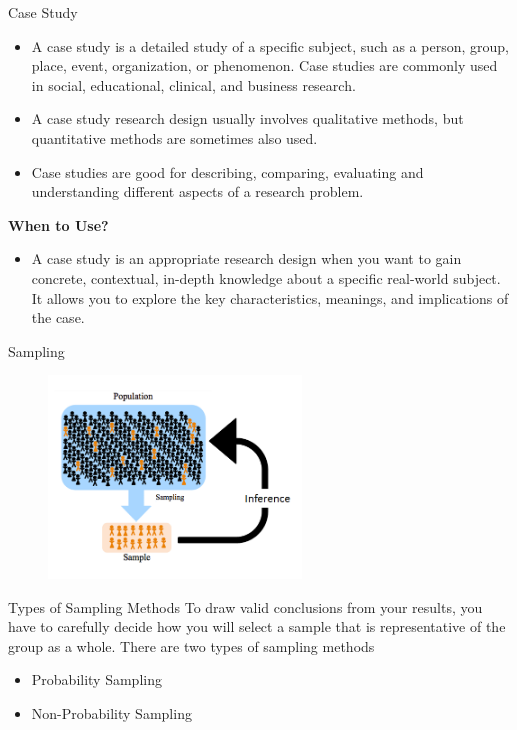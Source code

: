 \begin{frame}[t]{Case Study}
	\begin{itemize}
		\item A case study is a detailed study of a specific subject, such as a 
		person, group, place, event, organization, or phenomenon. Case studies 
		are commonly used in social, educational, clinical, and business 
		research.
		\item A case study research design usually involves qualitative 
		methods, but quantitative methods are sometimes also used. 
		\item Case studies are good for describing, comparing, evaluating and 
		understanding different aspects of a research problem.
	
	\end{itemize}
\textbf{When to Use?}
\begin{itemize}

	\item A case study is an appropriate research design when you want to gain 
	concrete, contextual, in-depth knowledge about a specific real-world 
	subject. It allows you to explore the key characteristics, meanings, and 
	implications of the case.
\end{itemize}
\end{frame}


\begin{frame}[t]{Sampling}
	\begin{figure} [ht]
		\centering
		\includegraphics[width=0.6\textwidth]{stats_img/population_sample.png}
	\end{figure}
\end{frame}

\begin{frame}[t]{Types of Sampling Methods}
	To draw valid conclusions from your results, you have to carefully decide 
	how you will select a sample that is representative of the group as a 
	whole. There are two types of sampling methods
	\begin{itemize}
		\item Probability Sampling
		\item Non-Probability Sampling 
	\end{itemize}
\end{frame}

